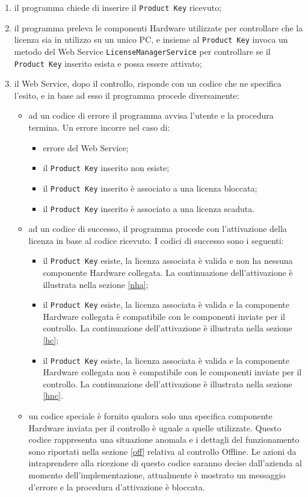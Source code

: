 \begin{enumerate}
\item il programma chiede di inserire il \texttt{Product Key} ricevuto;
\item il programma preleva le componenti Hardware utilizzate per controllare che la licenza sia in utilizzo su un unico PC, e insieme al \texttt{Product Key} invoca un metodo del Web Service \texttt{LicenseManagerService} per controllare se il \texttt{Product Key} inserito esista e possa essere attivato;
\item il Web Service, dopo il controllo, risponde con un codice che ne specifica l'esito, e in base ad esso il programma procede diversamente:
\begin{itemize}
\item ad un codice di errore il programma avvisa l'utente e la procedura termina. Un errore incorre nel caso di: \begin{itemize}
\item errore del Web Service;
\item il \texttt{Product Key} inserito non esiste;
\item il \texttt{Product Key} inserito è associato a una licenza bloccata;
\item il \texttt{Product Key} inserito è associato a una licenza scaduta.
\end{itemize}
\item ad un codice di successo, il programma procede con l'attivazione della licenza in base al codice ricevuto. I codici di successo sono i seguenti:
\begin{itemize}
\item il \texttt{Product Key} esiste, la licenza associata è valida e non ha nessuna componente Hardware collegata. La continuazione dell'attivazione è illustrata nella sezione \ref{nha};
\item il \texttt{Product Key} esiste, la licenza associata è valida e la componente Hardware collegata è compatibile con le componenti inviate per il controllo. La continuazione dell'attivazione è illustrata nella sezione \ref{hc};
\item il \texttt{Product Key} esiste, la licenza associata è valida e la componente Hardware collegata non è compatibile con le componenti inviate per il controllo. La continuazione dell'attivazione è illustrata nella sezione \ref{hnc}.
\end{itemize}
\item un codice speciale è fornito qualora solo una specifica componente Hardware inviata per il controllo è uguale a quelle utilizzate. Questo codice rappresenta una situazione anomala e i dettagli del funzionamento sono riportati nella sezione \ref{off} relativa al controllo Offline. Le azioni da intraprendere alla ricezione di questo codice saranno decise dall'azienda al momento dell'implementazione, attualmente è mostrato un messaggio d'errore e la procedura d'attivazione è bloccata.
\end{itemize}
\end{enumerate}


